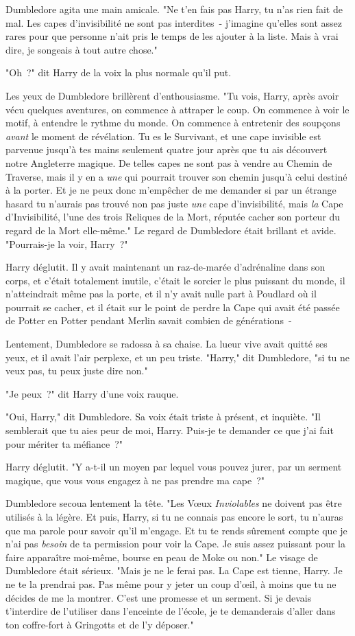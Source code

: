 Dumbledore agita une main amicale. "Ne t'en fais pas Harry, tu n'as rien fait de mal. Les capes d'invisibilité ne sont pas interdites~- j'imagine qu'elles sont assez rares pour que personne n'ait pris le temps de les ajouter à la liste. Mais à vrai dire, je songeais à tout autre chose."

"Oh~?" dit Harry de la voix la plus normale qu'il put.

Les yeux de Dumbledore brillèrent d'enthousiasme. "Tu vois, Harry, après avoir vécu quelques aventures, on commence à attraper le coup. On commence à voir le motif, à entendre le rythme du monde. On commence à entretenir des soupçons \emph{avant} le moment de révélation. Tu es le Survivant, et une cape invisible est parvenue jusqu'à tes mains seulement quatre jour après que tu ais découvert notre Angleterre magique. De telles capes ne sont pas à vendre au Chemin de Traverse, mais il y en a \emph{une} qui pourrait trouver son chemin jusqu'à celui destiné à la porter. Et je ne peux donc m'empêcher de me demander si par un étrange hasard tu n'aurais pas trouvé non pas juste \emph{une} cape d'invisibilité, mais \emph{la} Cape d'Invisibilité, l'une des trois Reliques de la Mort, réputée cacher son porteur du regard de la Mort elle-même." Le regard de Dumbledore était brillant et avide. "Pourrais-je la voir, Harry~?"

Harry déglutit. Il y avait maintenant un raz-de-marée d'adrénaline dans son corps, et c'était totalement inutile, c'était le sorcier le plus puissant du monde, il n'atteindrait même pas la porte, et il n'y avait nulle part à Poudlard où il pourrait se cacher, et il était sur le point de perdre la Cape qui avait été passée de Potter en Potter pendant Merlin savait combien de générations~-

Lentement, Dumbledore se radossa à sa chaise. La lueur vive avait quitté ses yeux, et il avait l'air perplexe, et un peu triste. "Harry," dit Dumbledore, "si tu ne veux pas, tu peux juste dire non."

"Je peux~?" dit Harry d'une voix rauque.

"Oui, Harry," dit Dumbledore. Sa voix était triste à présent, et inquiète. "Il semblerait que tu aies peur de moi, Harry. Puis-je te demander ce que j'ai fait pour mériter ta méfiance~?"

Harry déglutit. "Y a-t-il un moyen par lequel vous pouvez jurer, par un serment magique, que vous vous engagez à ne pas prendre ma cape~?"

Dumbledore secoua lentement la tête. "Les Vœux \emph{Inviolables} ne doivent pas être utilisés à la légère. Et puis, Harry, si tu ne connais pas encore le sort, tu n'auras que ma parole pour savoir qu'il m'engage. Et tu te rends sûrement compte que je n'ai pas \emph{besoin} de ta permission pour voir la Cape. Je suis assez puissant pour la faire apparaître moi-même, bourse en peau de Moke ou non." Le visage de Dumbledore était sérieux. "Mais je ne le ferai pas. La Cape est tienne, Harry. Je ne te la prendrai pas. Pas même pour y jeter un coup d'œil, à moins que tu ne décides de me la montrer. C'est une promesse et un serment. Si je devais t'interdire de l'utiliser dans l'enceinte de l'école, je te demanderais d'aller dans ton coffre-fort à Gringotts et de l'y déposer."

